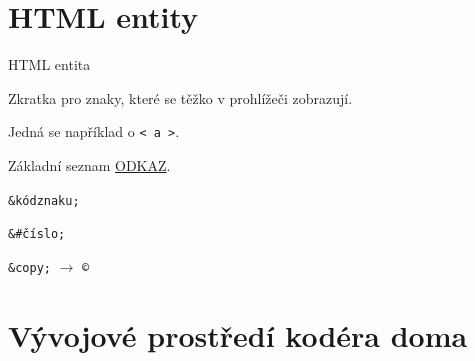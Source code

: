 \documentclass[aspectratio=1610]{beamer}
\begin{document}
\section{HTML entity}
\begin{frame}{HTML entita}
    \begin{cardTiny}
        \begin{flushleft}
            Zkratka pro znaky, které se těžko v prohlížeči zobrazují.

            Jedná se například o \texttt{< a >}.

            Základní seznam \href{https://www.w3schools.com/html/html_entities.asp}{ODKAZ}.
        \end{flushleft}
    \end{cardTiny}
    \begin{cardTiny}
        \begin{center}
        \texttt{\&kódznaku;}

        \texttt{\&\#číslo;}
        \end{center}
    \end{cardTiny}
    \begin{cardTiny}
        \begin{center}
        \texttt{\&copy;} $\rightarrow$ \texttt{©}
        \end{center}
    \end{cardTiny}
\end{frame}



\section{Vývojové prostředí kodéra doma}
\end{document}
